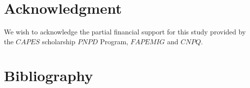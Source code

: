 \documentclass[review]{elsarticle}
\begin{document}
\section{Acknowledgment}
We wish to acknowledge the partial financial support for this study provided by the $CAPES$ 
scholarship
$PNPD$ Program, $FAPEMIG$ and $CNPQ$.

\section{Bibliography}


\end{document}

